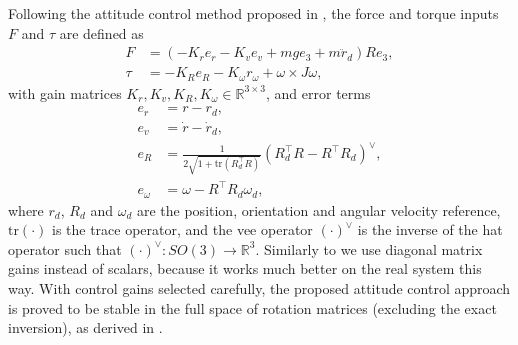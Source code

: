 Following the attitude control method proposed in \cite{lelemc2010}, the force and torque inputs $F$ and $\tau$ are defined as
\begin{subequations}\label{eq:geomlaw}
\begin{align}
    F&= (-K_r e_r - K_v e_v + m g e_3+m \ddot r_d) R e_3,\\
    \tau &= -K_R e_R - K_\omega r_\omega + \omega\times J \omega,\label{eq:geomtau}
\end{align}
\end{subequations}
with gain matrices $K_r, K_v, K_R, K_\omega \in \mathbb{R}^{3\times 3}$, and error terms
\begin{subequations}\label{eq:geomerrors}
\begin{align}
    e_r &= r-r_d,\\
    e_v &= \dot r - \dot r_d,\\
    e_R &= \frac{1}{2\sqrt{1+\mathrm{tr}\left( R_d^\top R \right)}}\left(R_d^\top R - R^\top R_d\right)^\vee,\\
    e_\omega &= \omega - R^\top R_d\omega_d,
\end{align}
\end{subequations}
where $r_d$, $R_d$ and $\omega_d$ are the position, orientation and angular velocity reference, $\mathrm{tr}(\cdot)$ is the trace operator, and the vee operator $(\cdot)^\vee$ is the inverse of the hat operator such that $(\cdot)^\vee:SO(3)\rightarrow \mathbb{R}^3$. Similarly to \cite{mellinger2011} we use diagonal matrix gains instead of scalars, because it works much better on the real system this way. With control gains selected carefully, the proposed attitude control approach is proved to be stable in the full space of rotation matrices (excluding the exact inversion), as derived in \cite{lelemc2010}.

